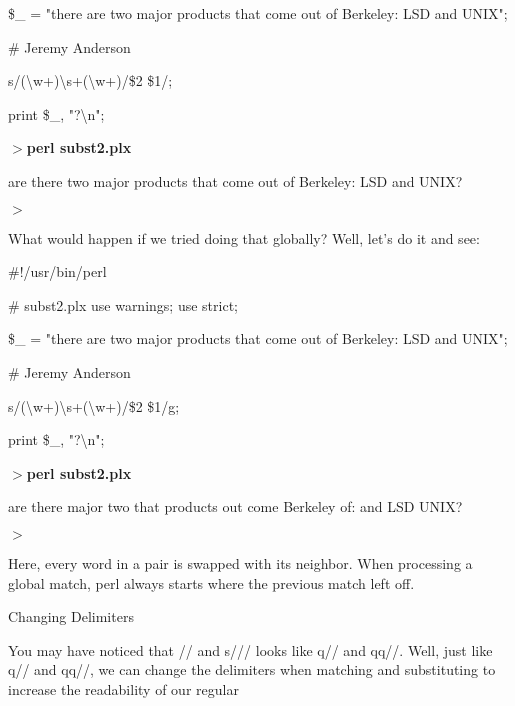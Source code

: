 \documentclass[a4paper,11pt]{book}
\begin{document}
\noindent \$\_  = "there are two major products that come out of Berkeley: LSD and UNIX";

\noindent \# Jeremy Anderson

\noindent 

\noindent s/(\textbackslash w+)\textbackslash s+(\textbackslash w+)/\$2 \$1/;

\noindent print \$\_, "?\textbackslash n";

\noindent 

\noindent $>$\textbf{perl subst2.plx}

\noindent are there two major products that come out of Berkeley: LSD and UNIX?

\noindent $>$

\noindent 

\noindent What would happen if we tried doing that globally? Well, let's do it and see:

\noindent 

\noindent 

\noindent \#!/usr/bin/perl

\noindent \# subst2.plx use warnings; use strict;

\noindent 

\noindent \$\_  = "there are two major products that come out of Berkeley: LSD and UNIX";

\noindent \# Jeremy Anderson

\noindent 

\noindent s/(\textbackslash w+)\textbackslash s+(\textbackslash w+)/\$2 \$1/g;

\noindent print \$\_, "?\textbackslash n";

\noindent 

\noindent $>$\textbf{perl subst2.plx}

\noindent are there major two that products out come Berkeley of: and LSD UNIX?

\noindent $>$

\noindent 

\noindent Here, every word in a pair is swapped with its neighbor. When processing a global match, perl always starts where the previous match left off.

\noindent 

\noindent Changing Delimiters

\noindent 

\noindent You may have noticed that // and s/// looks like q// and qq//. Well, just like q// and qq//, we can change the delimiters when matching and substituting to increase the readability of our regular
\end{document}
